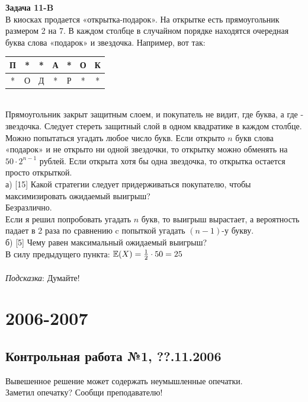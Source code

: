 \documentclass[12pt, a4paper]{article}\usepackage[]{graphicx}\usepackage[]{color}
\begin{document}
	{\bf Задача 11-B} \\
	В киосках продается «открытка-подарок». На открытке есть
	прямоугольник размером 2 на 7. В каждом столбце в случайном
	порядке находятся очередная буква слова «подарок» и звездочка.
	Например, вот так: \\
	\begin{tabular}{|c|c|c|c|c|c|c|}
		\hline
		П & * & * & А & * & О & К \\
		\hline
		* & О & Д & * & Р & * & * \\
		\hline
	\end{tabular} \\
	Прямоугольник закрыт защитным слоем, и покупатель не видит, где
	буква, а где - звездочка. Следует стереть защитный слой в одном
	квадратике в каждом столбце. Можно попытаться угадать любое число
	букв. Если открыто $n$ букв слова «подарок» и не открыто ни одной
	звездочки, то открытку можно обменять на $50\cdot 2^{n-1}$ рублей.
	Если открыта хотя бы одна звездочка, то открытка
	остается просто открыткой. \\
	а) [15] Какой стратегии следует придерживаться покупателю, чтобы
	максимизировать ожидаемый выигрыш? \\
	Безразлично. \\
	Если я решил попробовать угадать $n$ букв, то выигрыш вырастает, а
	вероятность падает в 2 раза по сравнению c попыткой угадать $(n-1)$-у букву.  \\
	б) [5] Чему равен максимальный ожидаемый выигрыш? \\
	В силу предыдущего пункта: $\mathbb{E}(X)=\frac{1}{2}\cdot 50=25$ \\ \\
	\emph{Подсказка}: Думайте! \\




	\section{2006-2007}




	\subsection{Контрольная работа №1, ??.11.2006}

	Вывешенное решение может содержать неумышленные опечатки. \\
	Заметил опечатку? Сообщи преподавателю! \\
\end{document}
